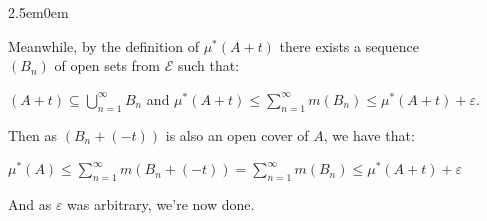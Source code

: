 \documentclass{book}
\newcommand{\hOne}{%
   \color{Black}%
   \fontsize{14}{16}\selectfont%
}
\newenvironment{myIndent}{%
   \begin{adjustwidth}{2.5em}{0em}%
}{%
   \end{adjustwidth}%
}
\newcommand{\mySepTwo}[1][.]{%
   {\noindent\color{#1}{\rule{6.5in}{0.5mm}}}\\%
}
\newcommand{\retTwo}{\hfill\bigbreak}
\begin{document}
\begin{enumerate}
{\begin{myIndent}
      Meanwhile, by the definition of $\mu^*(A + t)$ there exists a sequence\\ $(B_n)$ of open sets from $\mathcal{E}$ such that:

      {\centering$(A + t) \subseteq \bigcup\limits_{n=1}^\infty B_n$ and $\mu^*(A + t) \leq \sum\limits_{n=1}^\infty m(B_n) \leq \mu^*(A + t) + \varepsilon$.\retTwo\par}

      Then as $(B_n + (-t))$ is also an open cover of $A$, we have that:

      {\centering $\mu^*(A) \leq \sum\limits_{n=1}^\infty m(B_n + (-t)) = \sum\limits_{n=1}^\infty m(B_n) \leq \mu^*(A + t) + \varepsilon$\retTwo\par}

      And as $\varepsilon$ was arbitrary, we're now done.\retTwo
   \end{myIndent}}
\end{enumerate}

\mySepTwo\hOne
\end{document}
